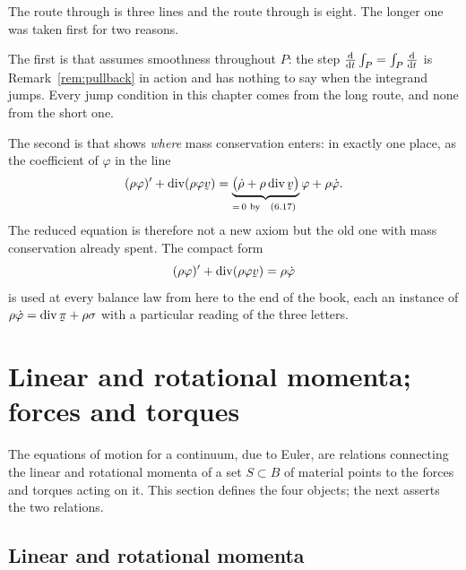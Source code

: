 \begin{remark}\label{rem:ch6shortroute}
The route through  is three lines and the route through
 is eight. The longer one was taken first for two reasons.

The first is that  assumes smoothness throughout $P$: the
step $\frac{\mathrm{d}}{\mathrm{d} t}\int_{P}=\int_{P}\frac{\mathrm{d}}{\mathrm{d} t}$ is
Remark~\ref{rem:pullback} in action and has nothing to say when the
integrand jumps. Every jump condition in this chapter comes from the
long route, and none from the short one.

The second is that  shows \emph{where} mass conservation
enters: in exactly one place, as the coefficient of $\varphi$ in the
line
\[
   (\rho\varphi)'+\dvg(\rho\varphi\bv)
   =\underbrace{\big(\dot\rho+\rho\dvg\bv\big)}_{=\,0
     \text{ by }\eqr{6.17}}\varphi+\rho\dot\varphi .
\]
The reduced equation  is therefore not a new axiom but the
old one with mass conservation already spent. The compact form
\[
   (\rho\varphi)'+\dvg(\rho\varphi\bv)=\rho\dot\varphi
\]
is used at every balance law from here to the end of the book, each an
instance of $\rho\dot\varphi=\dvg\vek\pi+\rho\sigma$ with a particular
reading of the three letters.
\end{remark}

\section{Linear and rotational momenta; forces and
torques}\label{sec:ch6momenta}

The equations of motion for a continuum, due to Euler, are relations
connecting the linear and rotational momenta of a set $S\subset B$ of
material points to the forces and torques acting on it. This section
defines the four objects; the next asserts the two relations.

\subsection{Linear and rotational momenta}\label{sec:ch6lrm}


